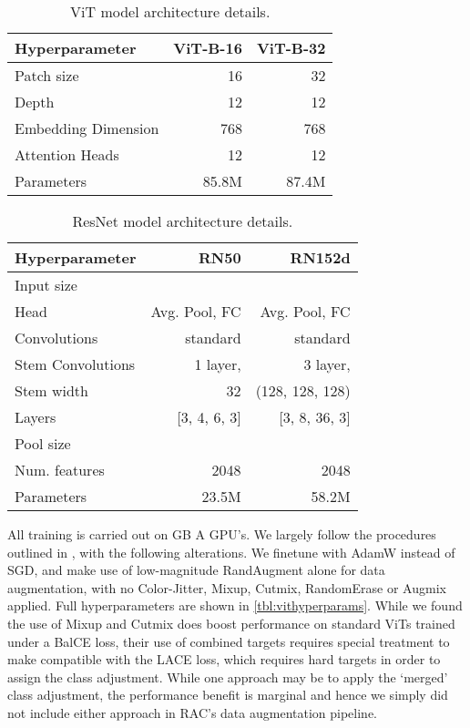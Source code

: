 \documentclass[10pt,twocolumn,letterpaper]{article}
\begin{document}
{\begin{table}[]
\centering
\begin{tabular}{@{}lrr@{}}
\toprule
\textbf{Hyperparameter} & \multicolumn{1}{c}{\textbf{ViT-B-16}} & \multicolumn{1}{c}{\textbf{ViT-B-32}} \\ \midrule
Patch size     & 16        & 32        \\
Depth          & 12        & 12        \\
Embedding Dimension & 768       & 768       \\
Attention Heads    & 12        & 12        \\
Parameters      & 85.8M     & 87.4M     \\ \bottomrule
\end{tabular}
\caption{ViT model architecture details.}
\label{tbl:vits}
\end{table}

\begin{table}
	\centering
	\begin{tabular}{@{}lrr@{}}
		\toprule
		\textbf{Hyperparameter}  & \textbf{RN50}    & \textbf{RN152d}     \\ \midrule
		Input size               &          &           \\
		Head                     & Avg. Pool, FC     & Avg. Pool, FC       \\
		Convolutions             & standard          & standard           \\
		Stem Convolutions        & 1 layer,       & 3 layer,         \\
		Stem width               & 32                & (128, 128, 128)       \\
		Layers                   & {[}3, 4, 6, 3{]}  & {[}3, 8, 36, 3{]}   \\
		Pool size               &                &  \\
		Num. features      &    2048               & 2048 \\
		Parameters               & 23.5M             & 58.2M             \\ \bottomrule
	\end{tabular}
	\caption{ResNet model architecture details. }
\label{tbl:resnets}
\end{table}

All training is carried out on  GB A GPU's. We largely follow the procedures outlined in \cite{howtotrainvit}, with the following alterations. We finetune with AdamW \cite{adamw} instead of SGD, and make use of low-magnitude RandAugment \cite{randaugment} alone for data augmentation, with no Color-Jitter, Mixup, Cutmix, RandomErase or Augmix applied. Full hyperparameters are shown in \cref{tbl:vithyperparams}. While we found the use of Mixup and Cutmix does boost performance on standard ViTs trained under a BalCE loss, their use of combined targets requires special treatment to make compatible with the LACE loss, which requires hard targets in order to assign the class adjustment. While one approach may be to apply the `merged' class adjustment, the performance benefit is marginal and hence we simply did not include either approach in RAC's data augmentation pipeline.  


}
\end{document}
